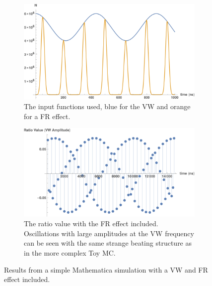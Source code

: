 \documentclass[12pt,letterpaper]{article}
\begin{document}
\begin{figure}[]
\centering
    \begin{subfigure}[t]{0.7\textwidth}
        \centering
        \includegraphics[width=\textwidth]{MathematicaMC_functionExample}
        \caption{The input functions used, blue for the VW and orange for a FR effect.}
    \end{subfigure}%
    \vspace{1cm}
    \begin{subfigure}[t]{0.7\textwidth}
        \centering
        \includegraphics[width=\textwidth]{MathematicaMC_withFR}
        \caption{The ratio value with the FR effect included. Oscillations with large amplitudes at the VW frequency can be seen with the same strange beating structure as in the more complex Toy MC.}
    \end{subfigure}
\caption[]{Results from a simple Mathematica simulation with a VW and FR effect included.}
\label{fig:MathematicaMC_VW_FR}
\end{figure}
\end{document}
